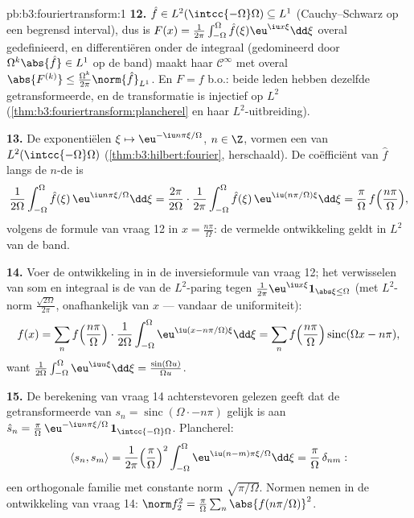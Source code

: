 \begin{solution}{pb:b3:fouriertransform:1}
\textbf{12.} $\hat f \in L^2(\intcc{-\Omega}\Omega) \subseteq
L^1$ (Cauchy--Schwarz op een begrensd interval), dus is $F(x) =
\frac1{2\pi}\int_{-\Omega}^\Omega\hat f(\xi)\eu^{\iu
x\xi}\dd\xi$ overal gedefinieerd, en differentiëren onder de
integraal (gedomineerd door $\Omega^k\abs{\hat f} \in L^1$ op de
band) maakt haar $\mathcal C^\infty$ met overal $\abs{F^{(k)}}
\leq \frac{\Omega^k}{2\pi}\norm{\hat f}_{L^1}$. En $F = f$ b.o.:
beide leden hebben dezelfde getransformeerde, en de transformatie
is injectief op $L^2$
(\cref{thm:b3:fouriertransform:plancherel} en haar
$L^2$-uitbreiding).

\textbf{13.} De exponentiëlen $\xi \mapsto \eu^{-\iu
n\pi\xi/\Omega}$, $n \in \Z$, vormen een  van
$L^2(\intcc{-\Omega}\Omega)$ (\cref{thm:b3:hilbert:fourier},
herschaald). De coëfficiënt van $\hat f$ langs de $n$-de is
\[
\frac1{2\Omega}\int_{-\Omega}^\Omega\hat f(\xi)\,
\eu^{\iu n\pi\xi/\Omega}\dd\xi
= \frac{2\pi}{2\Omega}\cdot
\frac1{2\pi}\int_{-\Omega}^{\Omega}\hat f(\xi)\,
\eu^{\iu(n\pi/\Omega)\xi}\dd\xi
= \frac\pi\Omega\,f\Bigl(\frac{n\pi}\Omega\Bigr),
\]
volgens de formule van vraag 12 in $x = \frac{n\pi}\Omega$: de
vermelde ontwikkeling geldt in $L^2$ van de band.

\textbf{14.} Voer de ontwikkeling in in de inversieformule van
vraag 12; het verwisselen van som en integraal is de 
van de $L^2$-paring tegen $\frac1{2\pi} \eu^{\iu
x\xi}\mathbf 1_{\abs\xi\leq\Omega}$ (met $L^2$-norm
$\frac{\sqrt{2\Omega}}{2\pi}$, onafhankelijk van $x$ --- vandaar
de uniformiteit):
\[
f(x) = \sum_nf\Bigl(\frac{n\pi}\Omega\Bigr)\cdot
\frac1{2\Omega}\int_{-\Omega}^\Omega
\eu^{\iu(x - n\pi/\Omega)\xi}\dd\xi
= \sum_nf\Bigl(\frac{n\pi}\Omega\Bigr)
\operatorname{sinc}(\Omega x - n\pi),
\]
want $\frac1{2\Omega}\int_{-\Omega}^\Omega\eu^{\iu u\xi}\dd\xi =
\frac{\sin(\Omega u)}{\Omega u}$.

\textbf{15.} De berekening van vraag 14 achterstevoren gelezen
geeft dat de getransformeerde van $s_n =
\operatorname{sinc}(\Omega\cdot - n\pi)$ gelijk is aan $\hat s_n
= \frac\pi\Omega\,\eu^{-\iu n\pi\xi/\Omega}\,\mathbf
1_{\intcc{-\Omega}\Omega}$. Plancherel:
\[
\langle s_n, s_m\rangle = \frac1{2\pi}
\Bigl(\frac\pi\Omega\Bigr)^2\int_{-\Omega}^\Omega
\eu^{\iu(n-m)\pi\xi/\Omega}\dd\xi =
\frac\pi\Omega\,\delta_{nm} :
\]
een orthogonale familie met constante norm
$\sqrt{\pi/\Omega}$. Normen nemen in de ontwikkeling van vraag
14: $\norm f_2^2 = \frac\pi\Omega\sum_n\abs{f(n\pi/\Omega)}^2$.


\end{solution}
